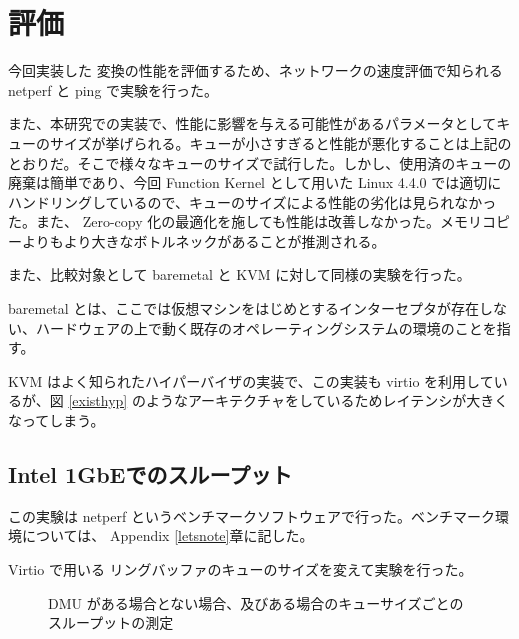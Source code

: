 \documentclass[a4paper,11pt,report]{ltjsbook}
\begin{document}
\chapter{評価}

今回実装した  変換の性能を評価するため、ネットワークの速度評価で知られる netperf と ping で実験を行った。

また、本研究での実装で、性能に影響を与える可能性があるパラメータとしてキューのサイズが挙げられる。キューが小さすぎると性能が悪化することは上記のとおりだ。そこで様々なキューのサイズで試行した。しかし、使用済のキューの廃棄は簡単であり、今回 Function Kernel として用いた Linux 4.4.0 では適切にハンドリングしているので、キューのサイズによる性能の劣化は見られなかった。また、 Zero-copy 化の最適化を施しても性能は改善しなかった。メモリコピーよりもより大きなボトルネックがあることが推測される。

また、比較対象として baremetal と KVM に対して同様の実験を行った。

baremetal とは、ここでは仮想マシンをはじめとするインターセプタが存在しない、ハードウェアの上で動く既存のオペレーティングシステムの環境のことを指す。

KVM はよく知られたハイパーバイザの実装で、この実装も virtio を利用しているが、図 \ref{existhyp} のようなアーキテクチャをしているためレイテンシが大きくなってしまう。

\section{Intel 1GbEでのスループット}

この実験は netperf というベンチマークソフトウェアで行った。ベンチマーク環境については、 Appendix \ref{letsnote}章に記した。

Virtio で用いる リングバッファのキューのサイズを変えて実験を行った。

\begin{figure}[H]
\caption{DMU がある場合とない場合、及びある場合のキューサイズごとのスループットの測定}
\end{figure}
\end{document}
